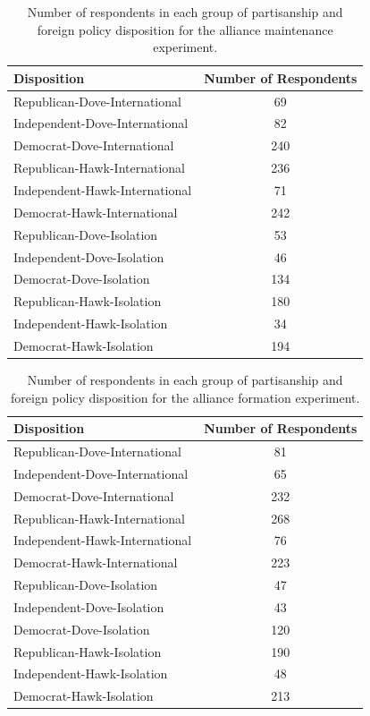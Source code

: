 \documentclass[12pt]{article}
\begin{document}
\begin{table}[htbp]
\centering
\begin{tabular}{lc}
  \hline
 Disposition  & Number of Respondents \\ 
  \hline
Republican-Dove-International &  69 \\ 
  Independent-Dove-International &  82 \\ 
  Democrat-Dove-International & 240 \\ 
  \hline
  Republican-Hawk-International & 236 \\ 
  Independent-Hawk-International &  71 \\ 
  Democrat-Hawk-International & 242 \\
  \hline  
  Republican-Dove-Isolation &  53 \\ 
  Independent-Dove-Isolation &  46 \\ 
  Democrat-Dove-Isolation & 134 \\ 
  \hline
  Republican-Hawk-Isolation & 180 \\ 
  Independent-Hawk-Isolation &  34 \\ 
  Democrat-Hawk-Isolation & 194 \\ 
   \hline
\end{tabular}
\caption{Number of respondents in each group of partisanship and foreign policy disposition for the alliance maintenance experiment.} 
\label{tab:party-dispo-main}
\end{table}


\begin{table}[htbp]
\centering
\begin{tabular}{lc}
  \hline
 Disposition  & Number of Respondents \\ 
  \hline
Republican-Dove-International &  81 \\ 
  Independent-Dove-International &  65 \\ 
  Democrat-Dove-International & 232 \\ 
  \hline
  Republican-Hawk-International & 268 \\ 
  Independent-Hawk-International &  76 \\ 
  Democrat-Hawk-International & 223 \\ 
  \hline
  Republican-Dove-Isolation &  47 \\ 
  Independent-Dove-Isolation &  43 \\ 
  Democrat-Dove-Isolation & 120 \\ 
  \hline
  Republican-Hawk-Isolation & 190 \\ 
  Independent-Hawk-Isolation &  48 \\ 
  Democrat-Hawk-Isolation & 213 \\ 
   \hline
\end{tabular}
\caption{Number of respondents in each group of partisanship 
               and foreign policy disposition for the alliance formation experiment.} 
\label{tab:party-dispo-form}
\end{table}
\end{document}
